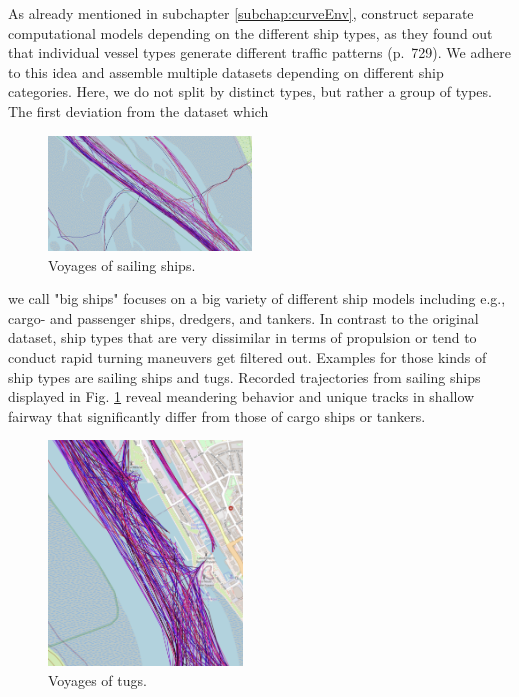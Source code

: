 As already mentioned in subchapter \ref{subchap:curveEnv}, \cite{venskus2021unsupervised} construct separate computational models depending on the different ship types, as they found out that individual vessel types generate different traffic patterns (p.~729). We adhere to this idea and assemble multiple datasets depending on different ship categories. Here, we do not split by distinct types, but rather a group of types. The first deviation from the dataset which
\begin{figure}
    \includegraphics[width=0.48\textwidth]{images/ais/tracks/Sailing.png}
    \caption{Voyages of sailing ships.}
    \label{fig:sailing}
\end{figure}
we call "big ships" focuses on a big variety of different ship models including e.g., cargo- and passenger ships, dredgers, and tankers.
In contrast to the original dataset, ship types that are very dissimilar in terms of propulsion or tend to conduct rapid turning maneuvers get filtered out. Examples for those kinds of ship types are sailing ships and tugs. Recorded trajectories from sailing ships displayed in Fig. \ref{fig:sailing} reveal meandering behavior and unique tracks in shallow fairway that significantly differ from those of cargo ships or tankers.
\newpage
\begin{figure}
    \includegraphics[width=0.46\textwidth]{images/ais/tracks/Tugs.png}
    \caption{Voyages of tugs.}
    \label{fig:tugs}
\end{figure}

